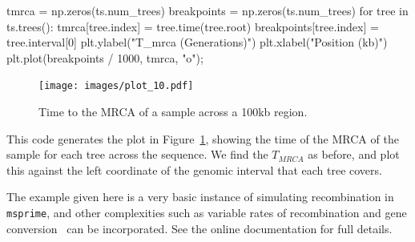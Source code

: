 \documentclass[graybox]{svmult}
\newcommand{\msprime}[0]{\texttt{msprime}}
\newcommand{\tskit}[0]{\texttt{tskit}}
\begin{document}
\begin{pythoncode}
tmrca = np.zeros(ts.num_trees)
breakpoints = np.zeros(ts.num_trees)
for tree in ts.trees():
    tmrca[tree.index] = tree.time(tree.root)
    breakpoints[tree.index] = tree.interval[0]
plt.ylabel("T_mrca (Generations)")
plt.xlabel("Position (kb)")
plt.plot(breakpoints / 1000, tmrca, "o");
\end{pythoncode}

\begin{figure}
\begin{center}
\texttt{[image: images/plot\_10.pdf]}
\end{center}
\caption{\label{fig:tree_tmrcas}Time to the MRCA of
a sample across a 100kb region.}
\end{figure}

This code generates the plot in Figure~\ref{fig:tree_tmrcas}, showing the time
of the MRCA of the sample for each tree across the sequence. We find the
\(T_{MRCA}\) as before, and plot this against the left coordinate of the
genomic interval that each tree covers. 

The example given here is a very basic instance of simulating
recombination in \msprime,  and other complexities such as 
variable rates of recombination and gene 
conversion~\citep{wiuf2000coalescent} can be incorporated. 
See the online documentation for full details.




\end{document}
